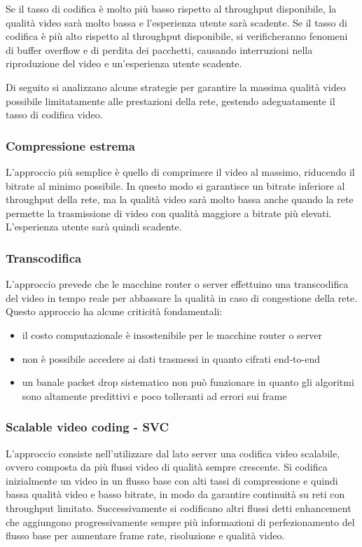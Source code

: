 Se il tasso di codifica è molto più basso rispetto al throughput disponibile, la qualità video sarà molto bassa e
l'esperienza utente sarà scadente. Se il tasso di codifica è più alto rispetto al throughput disponibile, si verificheranno
fenomeni di buffer overflow e di perdita dei pacchetti, causando interruzioni nella riproduzione del video e un'esperienza
utente scadente.

Di seguito si analizzano alcune strategie per garantire la massima qualità video possibile limitatamente alle prestazioni
della rete, gestendo adeguatamente il tasso di codifica video.

\subsubsection*{Compressione estrema}
L'approccio più semplice è quello di comprimere il video al massimo, riducendo il bitrate al minimo possibile. In questo
modo si garantisce un bitrate inferiore al throughput della rete, ma la qualità video sarà molto bassa anche quando la rete
permette la trasmissione di video con qualità maggiore a bitrate più elevati. L'esperienza utente sarà quindi scadente.

\subsubsection*{Transcodifica}
L'approccio prevede che le macchine router o server effettuino una transcodifica del video in tempo reale per abbassare
la qualità in caso di congestione della rete. Questo approccio ha alcune criticità fondamentali:
\begin{itemize}
	\item il costo computazionale è insostenibile per le macchine router o server
	\item non è possibile accedere ai dati trasmessi in quanto cifrati end-to-end
	\item un banale packet drop sistematico non può funzionare in quanto gli algoritmi sono altamente predittivi e poco
	tolleranti ad errori sui frame
\end{itemize}

\subsubsection*{Scalable video coding - SVC}
L'approccio consiste nell'utilizzare dal lato server una codifica video scalabile, ovvero composta da più flussi video
di qualità sempre crescente. Si codifica inizialmente un video in un flusso base con alti tassi di compressione e quindi
bassa qualità video e basso bitrate, in modo da garantire continuità su reti con throughput limitato. Successivamente si
codificano altri flussi detti enhancement che aggiungono progressivamente sempre più informazioni di perfezionamento del
flusso base per aumentare frame rate, risoluzione e qualità video.

